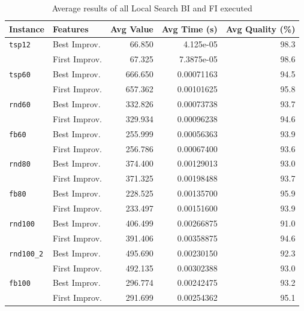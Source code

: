 	
	\begin{table}
		
		\begin{tabular}{llrrr}
			\toprule
			\textbf{Instance} & \textbf{Features} & \textbf{Avg Value} & \textbf{Avg Time (s)} & \textbf{Avg Quality} (\%) \\
			\midrule
			\verb|tsp12| 	& Best Improv. & 66.850 & 4.125e-05 & 98.3 \\
			& First Improv. & 67.325 & 7.3875e-05 & 98.6 \\
			\midrule
			\verb|tsp60| 	& Best Improv. & 666.650 & 0.00071163 & 94.5 \\
			& First Improv. & 657.362 & 0.00101625 & 95.8 \\
			\midrule
			\verb|rnd60| 	& Best Improv. & 332.826 & 0.00073738 & 93.7 \\
							& First Improv. & 329.934 & 0.00096238 & 94.6 \\
			\midrule
			\verb|fb60|		& Best Improv. & 255.999 & 0.00056363 & 93.9 \\
							& First Improv. & 256.786 & 0.00067400 & 93.6 \\ 
			\midrule
			\verb|rnd80| 	& Best Improv. & 374.400 & 0.00129013 & 93.0 \\
							& First Improv. & 371.325 & 0.00198488 & 93.7 \\
			\midrule
			\verb|fb80|		& Best Improv. & 228.525 & 0.00135700 & 95.9 \\
							& First Improv. & 233.497 & 0.00151600 &  93.9 \\
			\midrule
			\verb|rnd100| 	& Best Improv. & 406.499 & 0.00266875 & 91.0 \\
							& First Improv. & 391.406 & 0.00358875 & 94.6 \\
			\midrule
			\verb|rnd100_2| & Best Improv. & 495.690 & 0.00230150 & 92.3 \\
							& First Improv. & 492.135 & 0.00302388 & 93.0 \\
			\midrule
			\verb|fb100| & Best Improv. & 296.774 & 0.00242475 & 93.2 \\
						& First Improv. & 291.699 & 0.00254362 & 95.1 \\
			\bottomrule
		\end{tabular}
		\caption{\label{tab:AvgResultLS}Average results of all Local Search BI and FI executed}
	\end{table}
	
